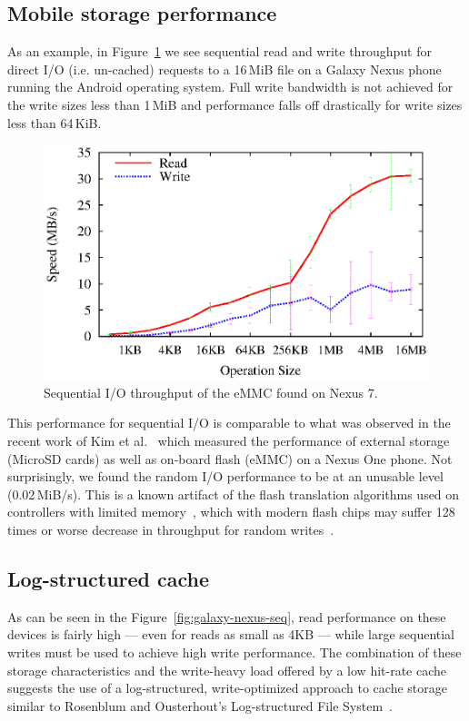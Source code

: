 \documentclass[letterpaper,twocolumn,10pt]{article}
\begin{document}
\subsection{Mobile storage performance}

As an example, in Figure~\ref{fig:seq-throughput} we see sequential read and
write throughput for direct I/O (i.e. un-cached) requests to a 16\,MiB file on a
Galaxy Nexus phone running the Android operating system. Full write bandwidth is
not achieved for the write sizes less than 1\,MiB and performance falls off
drastically for write sizes less than 64\,KiB.

\begin{figure}[t]
  \begin{center}
    \includegraphics[width=1.04\columnwidth]{graphs/seq-throughput}
  \end{center}
  \caption{Sequential I/O throughput of the eMMC found on Nexus 7.}
  \label{fig:seq-throughput}
\end{figure}

This performance for sequential I/O is comparable to what was observed in the
recent work of Kim et al.~\cite{kim12} which measured the performance of
external storage (MicroSD cards) as well as on-board flash (eMMC) on a Nexus One
phone.  Not surprisingly, we found the random I/O performance to be at an
unusable level (0.02\,MiB/s).  This is a known artifact of the flash translation
algorithms used on controllers with limited memory~\cite{Kim2002:FTL}, which
with modern flash chips may suffer 128 times or worse decrease in throughput for
random writes~\cite{boboila_performance_2011}.

\subsection{Log-structured cache}
As can be seen in the Figure~\ref{fig:galaxy-nexus-seq}, read performance on
these devices is fairly high --- even for reads as small as 4KB --- while large
sequential writes must be used to achieve high write performance.
The combination of these storage characteristics and the write-heavy load
offered by a low hit-rate cache suggests the use of a log-structured,
write-optimized approach to cache storage similar to Rosenblum and Ousterhout's
Log-structured File System~\cite{rosenblum92}.
\end{document}
